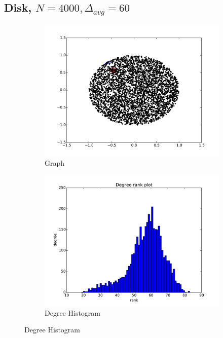 \documentclass[oneside, titlepage]{scrartcl}
\begin{document}
\subsection{Disk, $N=4000, \Delta_{avg}=60$}
\begin{figure}[!h]
\centering
\begin{subfigure}{0.5\textwidth}
	\centering
	\includegraphics[width=0.9\linewidth]{figures/graph6.pdf}
	\caption{Graph}
\end{subfigure}%
\begin{subfigure}{0.5\textwidth}
	\centering
	\includegraphics[width=0.9\linewidth]{figures/degrees6.pdf}
	\caption{Degree Histogram}
\end{subfigure}


\end{figure}
\end{document}
